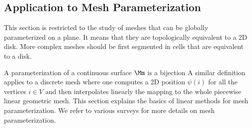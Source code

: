   



\subsection{Application to Mesh Parameterization} 
\label{subsec-mesh-param}

This section is restricted to the study of meshes that can be globally parameterized on a plane. It means that they are topologically equivalent to a 2D disk. More complex meshes should be first segmented in cells that are equivalent to a disk. 

A parameterization of a continuous surface $\Mm$ is a bijection 
A similar definition applies to a discrete mesh where one computes a 2D position $\psi(i)$ for all the vertices $i \in V$ and then interpolates linearly the mapping to the whole piecewise linear geometric mesh. This section explains the basics of linear methods for mesh parameterization. We refer to various surveys \cite{floater-parameterization-survey,sheffer-parameterization} for more details on mesh parameterization.

